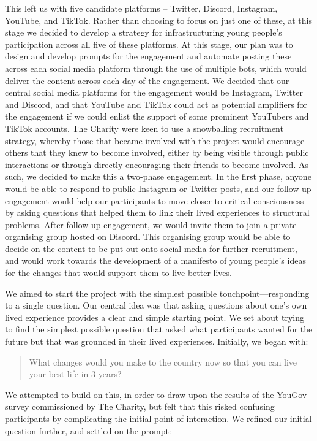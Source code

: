 This left us with five candidate platforms – Twitter, Discord, Instagram, YouTube, and TikTok. Rather than choosing to focus on just one of these, at this stage we decided to develop a strategy for infrastructuring young people's participation across all five of these platforms. At this stage, our plan was to design and develop prompts for the engagement and automate posting these across each social media platform through the use of multiple bots, which would deliver the content across each day of the engagement. We decided  that our central social media platforms for the engagement would be Instagram, Twitter and Discord, and that YouTube and TikTok could act as potential amplifiers for the engagement if we could enlist the support of some prominent YouTubers and TikTok accounts. The Charity were keen to use a snowballing recruitment strategy, whereby those that became involved with the project would encourage others that they knew to become involved, either by being visible through public interactions or through directly encouraging their friends to become involved. As such, we decided to make this a two-phase engagement. In the first phase, anyone would be able to respond to public Instagram or Twitter posts, and our follow-up engagement would help our participants to move closer to critical consciousness by asking questions that helped them to link their lived experiences to structural problems. After follow-up engagement, we would invite them to join a private organising group hosted on Discord. This organising group would be able to decide on the content to be put out onto social media for further recruitment, and would work towards the development of a manifesto of young people's ideas for the changes that would support them to live better lives. 

We aimed to start the project with the simplest possible touchpoint—responding to a single question. Our central idea was that asking questions about one’s own lived experience provides a clear and simple starting point. We set about trying to find the simplest possible question that asked what participants wanted for the future but that was grounded in their lived experiences. Initially, we began with:
\begin{quote}
What changes would you make to the country now so that you can live your best life in 3 years?
\end{quote}

We attempted to build on this, in order to draw upon the results of the YouGov survey commissioned by The Charity, but felt that this risked confusing participants by complicating the initial point of interaction. We refined our initial question further, and settled on the prompt:

